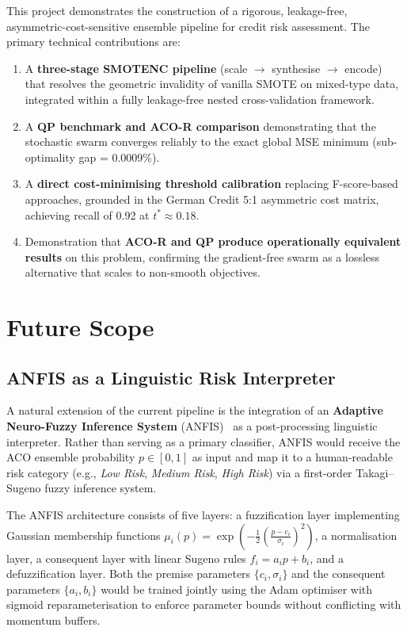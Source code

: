 \documentclass[12pt,a4paper]{article}
\begin{document}
This project demonstrates the construction of a rigorous, leakage-free, asymmetric-cost-sensitive ensemble pipeline for credit risk assessment. The primary technical contributions are:

\begin{enumerate}
    \item A \textbf{three-stage SMOTENC pipeline} (scale $\rightarrow$ synthesise $\rightarrow$ encode) that resolves the geometric invalidity of vanilla SMOTE on mixed-type data, integrated within a fully leakage-free nested cross-validation framework.
    \item A \textbf{QP benchmark and ACO-R comparison} demonstrating that the stochastic swarm converges reliably to the exact global MSE minimum (sub-optimality gap = 0.0009\%).
    \item A \textbf{direct cost-minimising threshold calibration} replacing F-score-based approaches, grounded in the German Credit 5:1 asymmetric cost matrix, achieving recall of 0.92 at $t^* \approx 0.18$.
    \item Demonstration that \textbf{ACO-R and QP produce operationally equivalent results} on this problem, confirming the gradient-free swarm as a lossless alternative that scales to non-smooth objectives.
\end{enumerate}

\section{Future Scope}

\subsection{ANFIS as a Linguistic Risk Interpreter}

A natural extension of the current pipeline is the integration of an \textbf{Adaptive Neuro-Fuzzy Inference System} (ANFIS)~\citep{jang1993anfis} as a post-processing linguistic interpreter. Rather than serving as a primary classifier, ANFIS would receive the ACO ensemble probability $p \in [0,1]$ as input and map it to a human-readable risk category (e.g., \textit{Low Risk}, \textit{Medium Risk}, \textit{High Risk}) via a first-order Takagi--Sugeno fuzzy inference system.

The ANFIS architecture consists of five layers: a fuzzification layer implementing Gaussian membership functions $\mu_i(p) = \exp\!\left(-\frac{1}{2}\left(\frac{p-c_i}{\sigma_i}\right)^2\right)$, a normalisation layer, a consequent layer with linear Sugeno rules $f_i = a_i p + b_i$, and a defuzzification layer. Both the premise parameters $\{c_i, \sigma_i\}$ and the consequent parameters $\{a_i, b_i\}$ would be trained jointly using the Adam optimiser with sigmoid reparameterisation to enforce parameter bounds without conflicting with momentum buffers.
\end{document}
